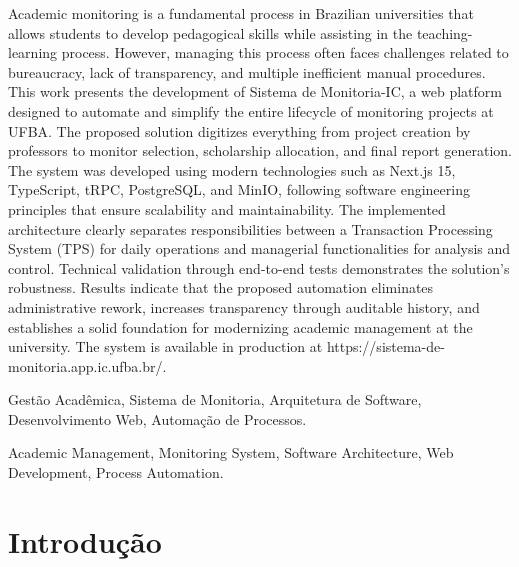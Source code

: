 \documentclass[portuguese]{sbc2025}%
\begin{document}
\begin{frontmatter}
\begin{abstract-en}
Academic monitoring is a fundamental process in Brazilian universities that allows students to develop pedagogical skills while assisting in the teaching-learning process. However, managing this process often faces challenges related to bureaucracy, lack of transparency, and multiple inefficient manual procedures. This work presents the development of Sistema de Monitoria-IC, a web platform designed to automate and simplify the entire lifecycle of monitoring projects at UFBA. The proposed solution digitizes everything from project creation by professors to monitor selection, scholarship allocation, and final report generation. The system was developed using modern technologies such as Next.js 15, TypeScript, tRPC, PostgreSQL, and MinIO, following software engineering principles that ensure scalability and maintainability. The implemented architecture clearly separates responsibilities between a Transaction Processing System (TPS) for daily operations and managerial functionalities for analysis and control. Technical validation through end-to-end tests demonstrates the solution's robustness. Results indicate that the proposed automation eliminates administrative rework, increases transparency through auditable history, and establishes a solid foundation for modernizing academic management at the university. The system is available in production at https://sistema-de-monitoria.app.ic.ufba.br/.
\end{abstract-en}

\begin{pchaves}
Gestão Acadêmica, Sistema de Monitoria, Arquitetura de Software, Desenvolvimento Web, Automação de Processos.
\end{pchaves}

\begin{keywords}
Academic Management, Monitoring System, Software Architecture, Web Development, Process Automation.
\end{keywords}

\begin{dates}
\end{dates}

\end{frontmatter}

\section{Introdução}
\label{sec:intro}
\end{document}
